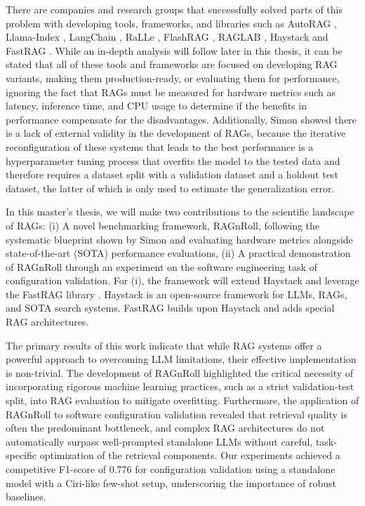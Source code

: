 There are companies and research groups that successfully solved parts of this problem with developing tools, frameworks, and libraries such as AutoRAG \cite{AutoRAG}, Llama-Index \cite{Liu_LlamaIndex_2022}, LangChain \cite{Chase_LangChain_2022}, RaLLe \cite{ralle}, FlashRAG \cite{FlashRAG}, RAGLAB \cite{zhang-etal-2024-raglab}, Haystack \cite{Pietsch_Haystack_the_end-to-end_2019} and FastRAG \cite{Izsak_fastRAG_Efficient_Retrieval_2023}. While an in-depth analysis will follow later in this thesis, it can be stated that all of these tools and frameworks are focused on developing RAG variants, making them production-ready, or evaluating them for performance, ignoring the fact that RAGs must be measured for hardware metrics such as latency, inference time, and CPU usage to determine if the benefits in performance compensate for the disadvantages. Additionally, Simon \cite{Simon.10112024} showed there is a lack of external validity in the development of RAGs, because the iterative reconfiguration of these systems that leads to the best performance is a hyperparameter tuning process that overfits the model to the tested data and therefore requires a dataset split with a validation dataset and a holdout test dataset, the latter of which is only used to estimate the generalization error.

In this master's thesis, we will make two contributions to the scientific landscape of RAGs: (i) A novel benchmarking framework, RAGnRoll, following the systematic blueprint shown by Simon \cite{Simon.10112024} and evaluating hardware metrics alongside state-of-the-art (SOTA) performance evaluations, (ii) A practical demonstration of RAGnRoll through an experiment on the software engineering task of configuration validation. For (i), the framework will extend Haystack \cite{Pietsch_Haystack_the_end-to-end_2019} and leverage the FastRAG library \cite{Izsak_fastRAG_Efficient_Retrieval_2023}. Haystack is an open-source framework for LLMs, RAGs, and SOTA search systems. FastRAG builds upon Haystack and adds special RAG architectures. 

The primary results of this work indicate that while RAG systems offer a powerful approach to overcoming LLM limitations, their effective implementation is non-trivial. The development of RAGnRoll highlighted the critical necessity of incorporating rigorous machine learning practices, such as a strict validation-test split, into RAG evaluation to mitigate overfitting. Furthermore, the application of RAGnRoll to software configuration validation revealed that retrieval quality is often the predominant bottleneck, and complex RAG architectures do not automatically surpass well-prompted standalone LLMs without careful, task-specific optimization of the retrieval components. Our experiments achieved a competitive F1-score of 0.776 for configuration validation using a standalone model with a Ciri-like few-shot setup, underscoring the importance of robust baselines.

